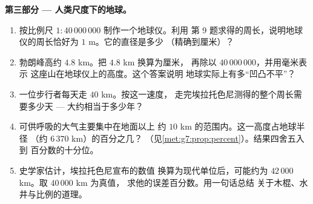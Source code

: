\begin{problem}
\medskip
\noindent\textbf{第三部分 --- 人类尺度下的地球。}
\begin{enumerate}[resume]
  \item 按比例尺 $1 : 40\,000\,000$ 制作一个地球仪。利用
        第 9 题求得的周长，说明地球仪的周长恰好为
        $1$ m。它的直径是多少
        （精确到厘米）？
  \item 勃朗峰高约 $4.8$ km。把 $4.8$ km 换算为厘米，
        再除以 $40\,000\,000$，并用毫米表示
        这座山在地球仪上的高度。这个答案说明
        地球实际上有多“凹凸不平”？
  \item 一位步行者每天走 $40$ km。按这一速度，
        走完埃拉托色尼测得的整个周长需要多少天 ---
        大约相当于多少年？
  \item 可供呼吸的大气主要集中在地面以上
        约 $10$ km 的范围内。这一高度占地球半径
        （约 $6\,370$ km）的百分之几？
        （见\cref{met:g7:prop:percent}）。结果四舍五入到
        百分数的十分位。
  \item 史学家估计，埃拉托色尼宣布的数值
        换算为现代单位后，可能约为
        $42\,000$ km。取 $40\,000$ km 为真值，
        求他的误差百分数。用一句话总结
        关于木棍、水井与比例的道理。
\end{enumerate}
\end{problem}
